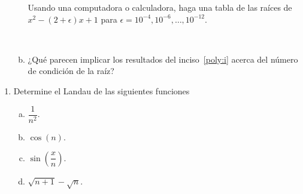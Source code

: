 \documentclass[
	spanish,
	8pt,
	utf8,
	xcolor=table,
	handout,
	aspectratio=169,
	professionalfonts,
	notheorems,
	mathserif,
]{beamer}
\newcounter{savedenum}
\newcommand*{\saveenum}{\setcounter{savedenum}{\theenumi}}
\newcommand*{\resume}{\setcounter{enumi}{\thesavedenum}}
\begin{document}
\begin{frame}
\begin{enumerate}
\begin{enumerate}[a)]
			      Usando una computadora o calculadora, haga una
			      tabla de las raíces de
			      $x^{2}-\left(2+\epsilon\right)x+1$ para
			      $\epsilon=10^{-4},10^{-6},\ldots,10^{-12}$.

			      \

			      \item

			            ¿Qué parecen implicar los resultados del
			            inciso~\eqref{poly:i} acerca del número de
			            condición de la raíz?
		      \end{enumerate}
		      \saveenum
	\end{enumerate}
\end{frame}

\begin{frame}
	\begin{enumerate}
		\resume

		\item
		      Determine el Landau de las siguientes funciones

		      \begin{multicols}{4}
			      \begin{enumerate}[a)]

				      \item

				            \begin{math}
					            \dfrac{1}{n^{2}}.
				            \end{math}

				      \item

				            \begin{math}
					            \cos\left(n\right).
				            \end{math}


				      \item

				            \begin{math}
					            \sin\left(\dfrac{x}{n}\right).
				            \end{math}

				      \item

				            \begin{math}
					            \sqrt{n+1}-\sqrt{n}.
				            \end{math}
			      \end{enumerate}
		      \end{multicols}


\end{enumerate}
\end{frame}
\end{document}
